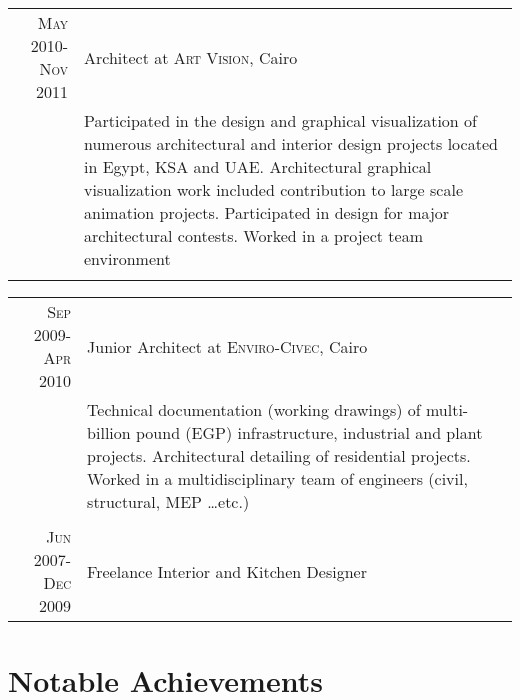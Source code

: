 \documentclass[a4paper,11pt]{article} %
\begin{document}
\begin{tabular}{r|p{11cm}}

\textsc{May 2010-Nov 2011} & Architect at \textsc{Art Vision}, Cairo \emph{}\\
& \footnotesize{Participated in the design and graphical visualization of numerous architectural and interior design projects located in Egypt, KSA and UAE. Architectural graphical visualization work included contribution to large scale animation projects. Participated in design for major architectural contests. Worked in a project team environment}\\
\multicolumn{2}{c}{} \\
\end{tabular}


\newpage

\begin{tabular}{r|p{11cm}}
\textsc{Sep 2009-Apr 2010} & Junior Architect at \textsc{Enviro-Civec}, Cairo \emph{}\\
& \footnotesize{Technical documentation (working drawings) of multi-billion pound (EGP) infrastructure, industrial and plant projects. Architectural detailing of residential projects. Worked in a multidisciplinary team of engineers (civil, structural, MEP \ldots{}etc.)}\\
\multicolumn{2}{c}{} \\


\textsc{Jun 2007-Dec 2009} & Freelance Interior and Kitchen Designer\\
\end{tabular}



\section{Notable Achievements}
\end{document}
